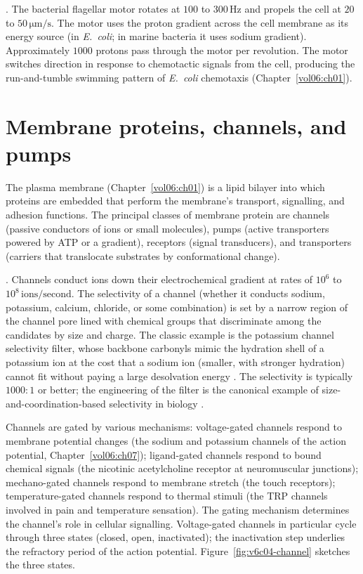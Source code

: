 . The bacterial flagellar
motor rotates at $100$ to $300\,\text{Hz}$ and propels the cell at
$20$ to $50\,\si{\micro\meter}/\text{s}$. The motor uses the proton
gradient across the cell membrane as its energy source (in
\emph{E.~coli}; in marine bacteria it uses sodium gradient).
Approximately $1000$ protons pass through the motor per revolution.
The motor switches direction in response to chemotactic signals from
the cell, producing the run-and-tumble swimming pattern of
\emph{E.~coli} chemotaxis (Chapter~\ref{vol06:ch01}).

\section{Membrane proteins, channels, and pumps}

The plasma membrane (Chapter~\ref{vol06:ch01}) is a lipid bilayer
into which proteins are embedded that perform the membrane's
transport, signalling, and adhesion functions. The principal classes
of membrane protein are channels (passive conductors of ions or
small molecules), pumps (active transporters powered by ATP or a
gradient), receptors (signal transducers), and transporters
(carriers that translocate substrates by conformational change).

. Channels conduct ions down their
electrochemical gradient at rates of $10^6$ to $10^8\,\text{ions}/
\text{second}$. The selectivity of a channel (whether it conducts
sodium, potassium, calcium, chloride, or some combination) is set by
a narrow region of the channel pore lined with chemical groups that
discriminate among the candidates by size and charge. The classic
example is the potassium channel selectivity filter, whose backbone
carbonyls mimic the hydration shell of a potassium ion at the cost
that a sodium ion (smaller, with stronger hydration) cannot fit
without paying a large desolvation energy
\cite{paper:v6c04-doyle-kcsa-1998}. The selectivity is typically
$1000:1$ or better; the engineering of the filter is the canonical
example of size-and-coordination-based selectivity in biology
\cite[ch.~14]{text:hille-ion-channels,text:v6c04-hille-channels-2001}.

Channels are gated by various mechanisms: voltage-gated channels
respond to membrane potential changes (the sodium and potassium
channels of the action potential, Chapter~\ref{vol06:ch07});
ligand-gated channels respond to bound chemical signals (the
nicotinic acetylcholine receptor at neuromuscular junctions);
mechano-gated channels respond to membrane stretch (the touch
receptors); temperature-gated channels respond to thermal stimuli
(the TRP channels involved in pain and temperature sensation). The
gating mechanism determines the channel's role in cellular
signalling. Voltage-gated channels in particular cycle through three
states (closed, open, inactivated); the inactivation step underlies
the refractory period of the action potential.
Figure~\ref{fig:v6c04-channel} sketches the three states.

